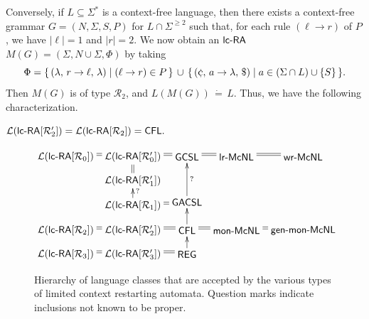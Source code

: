 Conversely, if $L\subseteq\Sigma^*$ is a context-free language, then there exists a context-free grammar $G=(N,\Sigma,S,P)$ for $L\cap\Sigma^{\ge 2}$ such that, for each rule $(\ell\to r)$ of $P$, we have $|\ell|=1$ and $|r|=2$. We now obtain an $\lcRA$ $M(G)=(\Sigma,N\cup\Sigma,\Phi)$ by taking
$$\Phi = \{\,\rarule{\lambda}{r}{\ell}{\lambda}\mid (\ell\to r)\in P\,\}\,\cup\,
         \{\,\rarule{\cent}{a}{\lambda}{\$}\mid a\in(\Sigma\cap L)\cup\{S\}\,\}.$$
Then $M(G)$ is of type $\mathcal{R}_2$, and $L(M(G))\,\dot{=}\,L$. Thus, we have the following characterization.
\begin{theorem}\label{PropR2}
${\mathcal L}(\lcRAp[2]) = {\mathcal L}(\lcRA[2]) = \CFL.$
\end{theorem}

\begin{figure}
{\small
\[ \xymatrix@R8pt@C5pt{
\txt{${\mathcal L}(\textup{\sf lc-RA}[{\mathcal R}_0])$}\ar@{=}[r] &
\txt{${\mathcal L}(\textup{\sf lc-RA}[{\mathcal R}_0'])$}\ar@{=}[r] & \txt{\sf GCSL} \ar@{=}[r]
                   & \txt{$\textup{\sf lr-McNL}$}\ar@{=}[r] & \txt{$\textup{\sf wr-McNL}$}\\
                                                           &
\txt{${\mathcal L}(\textup{\sf lc-RA}[{\mathcal R}_1'])$}\ar@{=}[u]  \\
                                                           &
\txt{${\mathcal L}(\textup{\sf lc-RA}[{\mathcal R}_1])$} \ar@{->}_?[u]  
                   & \GACSL\ar@{=}[l]\ar@{->}_?[uu]\\
\txt{${\mathcal L}(\textup{\sf lc-RA}[{\mathcal R}_2])$}\ar@{=}[r] &
\txt{${\mathcal L}(\textup{\sf lc-RA}[{\mathcal R}_2'])$}\ar@{=}[r] &
\txt{\sf CFL}\ar@{->}[u]\ar@{=}[r] 
& \txt{$\textup{\sf mon-McNL}$}\ar@{=}[r] & \txt{$\textup{\sf gen-mon-McNL}$}\\
\txt{${\mathcal L}(\textup{\sf lc-RA}[{\mathcal R}_3])$}\ar@{=}[r] &
\txt{${\mathcal L}(\textup{\sf lc-RA}[{\mathcal R}_3'])$}\ar@{=}[r] &
\txt{\sf REG}\ar@{->}[u]\\
}
\]
\caption{Hierarchy of language classes that are accepted by the various types of
limited context restarting automata.
Question marks indicate inclusions not known to be proper.}\label{Fig1}
}
\end{figure}

